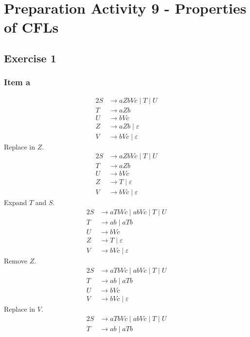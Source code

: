 \documentclass[docid=PA09]{tcom_PA}
\begin{document}
\setcounter{section}{8}
\section{Preparation Activity 9 - Properties of CFLs}
{
\renewcommand{\thesubsubsection}{\thesubsection\alph{subsubsection}}
\subsection{Exercise 1}
\subsubsection{Item a}
\begin{alignat*}{2}
	S &\rightarrow aZbVc\mid T\mid U\\
	T &\rightarrow aZb\\
	U &\rightarrow bVc\\
	Z &\rightarrow aZb\mid \varepsilon \\
	V &\rightarrow bVc\mid \varepsilon
\end{alignat*}
Replace in $Z$.
\begin{alignat*}{2}
	S &\rightarrow aZbVc\mid T\mid U\\
	T &\rightarrow aZb\\
	U &\rightarrow bVc\\
	Z &\rightarrow T\mid \varepsilon \\
	V &\rightarrow bVc\mid \varepsilon
\end{alignat*}
Expand $T$ and $S$.
\begin{alignat*}{2}
	S &\rightarrow aTbVc\mid abVc\mid T\mid U\\
	T &\rightarrow ab\mid aTb\\
	U &\rightarrow bVc\\
	Z &\rightarrow T\mid \varepsilon \\
	V &\rightarrow bVc\mid \varepsilon
\end{alignat*}
Remove $Z$.
\begin{alignat*}{2}
	S &\rightarrow aTbVc\mid abVc\mid T\mid U\\
	T &\rightarrow ab\mid aTb\\
	U &\rightarrow bVc\\
	V &\rightarrow bVc\mid \varepsilon
\end{alignat*}
Replace in $V$.
\begin{alignat*}{2}
	S &\rightarrow aTbVc\mid abVc\mid T\mid U\\
	T &\rightarrow ab\mid aTb\\

\end{alignat*}}
\end{document}
